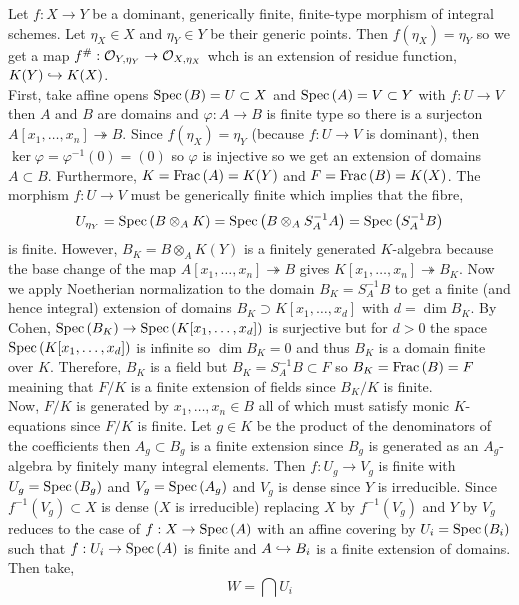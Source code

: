 \documentclass[12pt]{article}
\begin{document}
Let $f : X \to Y$ be a dominant, generically finite, finite-type morphism of integral schemes. Let $\eta_X \in X$ and $\eta_Y \in Y$ be their generic points. Then $f(\eta_X) = \eta_Y$ so we get a map $f^\# : \mathcal{O}_{Y, \eta_Y} \to \mathcal{O}_{X, \eta_X}$ whch is an extension of residue function, $K(Y) \hookrightarrow K(X)$. 
\bigskip\\
First, take affine opens $\mathrm{Spec}\left( B \right) = U \subset X$ and $\mathrm{Spec}\left( A \right) = V \subset Y$ with $f : U \to V$ then $A$ and $B$ are domains and $\varphi : A \to B$ is finite type so there is a surjecton $A[x_1, \dots, x_n] \twoheadrightarrow B$. Since $f(\eta_X) = \eta_Y$ (because $f : U \to V$ is dominant), then $\ker{\varphi} = \varphi^{-1}(0) = (0)$ so $\varphi$ is injective so we get an extension of domains $A \subset B$. Furthermore, $K = \mathrm{Frac}\left(A\right) = K(Y)$ and $F = \mathrm{Frac}\left(B\right) = K(X)$. The morphism $f : U \to V$ must be generically finite which implies that the fibre,
\[ U_{\eta_Y} = \mathrm{Spec}\left( B \otimes_A K \right) = \mathrm{Spec}\left( B \otimes_A S^{-1}_A A \right) = \mathrm{Spec}\left( S_A^{-1} B \right) \]
is finite. However, $B_K = B \otimes_A K(Y)$ is a finitely generated $K$-algebra because the base change of the map $A[x_1, \dots, x_n] \twoheadrightarrow B$ gives $K[x_1, \dots, x_n] \twoheadrightarrow B_K$. Now we apply Noetherian normalization to the domain $B_K = S_A^{-1} B$ to get a finite (and hence integral) extension of domains $B_K \supset K[x_1, \dots, x_d]$ with $d = \dim{B_K}$. By Cohen, $\mathrm{Spec}\left( B_K \right) \to \mathrm{Spec}\left( K[x_1, \dots, x_d] \right)$ is surjective but for $d > 0$ the space $\mathrm{Spec}\left( K[x_1, \dots, x_d] \right)$ is infinite so $\dim{B_K} = 0$ and thus $B_K$ is a domain finite over $K$. Therefore, $B_K$ is a field but $B_K = S_A^{-1} B \subset F$ so $B_K = \mathrm{Frac}\left(B\right) = F$ meaining that $F / K$ is a finite extension of fields since $B_K / K$ is finite. 
\bigskip\\
Now, $F / K$ is generated by $x_1, \dots, x_n \in B$ all of which must satisfy monic $K$-equations since $F / K$ is finite. Let $g \in K$ be the product of the denominators of the coefficients then $A_g \subset B_g$ is a finite extension since $B_g$ is generated as an $A_g$-algebra by finitely many integral elements. Then $f : U_g \to V_g$ is finite with $U_g = \mathrm{Spec}\left( B_g \right)$ and $V_g = \mathrm{Spec}\left( A_g \right)$ and $V_g$ is dense since $Y$ is irreducible. Since $f^{-1}(V_g) \subset X$ is dense ($X$ is irreducible) replacing $X$ by $f^{-1}(V_g)$ and $Y$ by $V_g$ reduces to the case of $f : X \to \mathrm{Spec}\left( A \right)$ with an affine covering by $U_i = \mathrm{Spec}\left( B_i \right)$ such that $f : U_i \to \mathrm{Spec}\left( A \right)$ is finite and $A \hookrightarrow B_i$ is a finite extension of domains. Then take,
\[ W = \bigcap U_i \]
\end{document}
